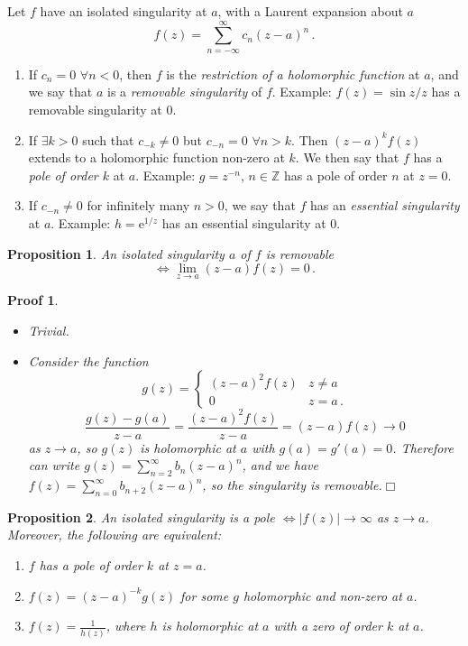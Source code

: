 \documentclass{article}
\theoremstyle{plain}\theoremheaderfont{\normalfont\itshape}\theorembodyfont{\rmfamily}\theoremseparator{.}\newtheorem*{rem}{Remark}\newtheorem*{ex}{Example}\newtheorem*{proof}{Proof}\newtheorem*{altp}{Alternative proof}\newtheorem*{con}{Consequences}\newtheorem*{notn}{Notations}\newtheorem*{cau}{Caution}\newtheorem*{term}{Terminology}\newtheorem*{keyex}{Key example}
\theoremstyle{plain}\theoremheaderfont{\normalfont\bfseries}\theorembodyfont{\rmfamily}\theoremseparator{.}\newtheorem{thm}{Theorem}[section]\newtheorem{lem}[thm]{Lemma}\newtheorem{prop}[thm]{Proposition}\newtheorem*{cor}{Corollary}\newtheorem{defn}[thm]{Definition}\newtheorem{clm}[thm]{Claim}\newtheorem{clminproof}{Claim}\newtheorem{leminproof}{Lemma}\newtheorem{app}{Application}
\theoremstyle{break}\theoremheaderfont{\normalfont\itshape}\theorembodyfont{\rmfamily}\theoremseparator{.\medskip}\newtheorem*{proofskip}{Proof}\newtheorem*{exs}{Examples}\newtheorem*{rems}{Remarks}\newtheorem*{rec}{Recall}\newtheorem*{ppts}{Properties}
\theoremstyle{break}\theoremheaderfont{\normalfont\bfseries}\theorembodyfont{\rmfamily}\theoremseparator{.\medskip}\newtheorem{lemskip}[thm]{Lemma}\newtheorem{defnskip}[thm]{Definition}\newtheorem{propskip}[thm]{Proposition}\newtheorem{thmskip}[thm]{Theorem}
\numberwithin{equation}{section}
\newcommand{\ee}{\mathrm{e}}
\newcommand{\qed}{\hfill\ensuremath{\Box}}
\newcommand{\abs}[1]{\left|#1\right|}
\newcommand{\ZZ}{\mathbb{Z}}
\begin{document}
    Let \(f\) have an isolated singularity at \(a\), with a Laurent expansion about \(a\)
    \[f(z)=\sum_{n=-\infty}^{\infty}c_n(z-a)^n\,.\]
    \begin{enumerate}[topsep=0pt,label=(\roman*)]
        \item If \(c_n=0\) \(\forall n<0\), then \(f\) is the \textit{restriction of a holomorphic function} at \(a\), and we say that \(a\) is a \textit{removable singularity} of \(f\). Example: \(f(z)=\sin z/z\) has a removable singularity at \(0\).
        \item If \(\exists k>0\) such that \(c_{-k}\ne 0\) but \(c_{-n}=0\) \(\forall n>k\). Then \((z-a)^kf(z)\) extends to a holomorphic function non-zero at \(k\). We then say that \(f\) has a \textit{pole of order \(k\)} at \(a\). Example: \(g=z^{-n}\), \(n\in\ZZ\) has a pole of order \(n\) at \(z=0\).
        \item If \(c_{-n}\ne 0\) for infinitely many \(n>0\), we say that \(f\) has an \textit{essential singularity} at \(a\). Example: \(h=\ee^{1/z}\) has an essential singularity at \(0\).
    \end{enumerate}
    \begin{prop}
        An isolated singularity \(a\) of \(f\) is removable
        \[\iff \lim_{z\to a}(z-a)f(z)=0\,.\]
    \end{prop}
    \begin{proofskip}
        \begin{itemize}[topsep=0pt]
            \item[(\(\Rightarrow\))] Trivial.
            \item[(\(\Leftarrow\))] Consider the function
            \[g(z)=\begin{cases}
                (z-a)^2f(z) & z\ne a\\
                0 & z=a\,.
            \end{cases}\]
            \[\frac{g(z)-g(a)}{z-a}=\frac{(z-a)^2f(z)}{z-a}=(z-a)f(z)\to 0\]
            as \(z\to a\), so \(g(z)\) is holomorphic at \(a\) with \(g(a)=g'(a)=0\). Therefore can write \(g(z)=\sum_{n=2}^{\infty}b_n(z-a)^n\), and we have \(f(z)=\sum_{n=0}^{\infty}b_{n+2}(z-a)^n\), so the singularity is removable.\qed
        \end{itemize}
    \end{proofskip}
    \begin{prop}
        An isolated singularity is a pole \(\iff\abs{f(z)}\to\infty\) as \(z\to a\). Moreover, the following are equivalent:
        \begin{enumerate}[topsep=0pt,label=(\roman*)]
            \item \(f\) has a pole of order \(k\) at \(z=a\).
            \item \(f(z)=(z-a)^{-k}g(z)\) for some \(g\) holomorphic and non-zero at \(a\).
            \item \(f(z)=\frac{1}{h(z)}\), where \(h\) is holomorphic at \(a\) with a zero of order \(k\) at \(a\).
        \end{enumerate}
    \end{prop}
\end{document}
